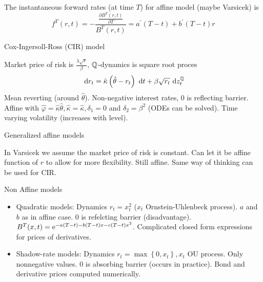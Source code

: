 The instantaneous forward rates (at time $T$) for affine model (maybe Varsicek) is
\[
f^{T}(r, t)=-\frac{\frac{\partial B^{T}(r, t)}{\partial T}}{B^{T}(r,
t)}=a^{\prime}(T-t)+b^{\prime}(T-t) r
\]
\begin{description}
\item[Cox-Ingersoll-Ross (CIR) model] 
\end{description}
Market price of risk is $\frac{\lambda \sqrt{r}}{\beta}$, $\mathbb{Q}$-dynamics is square root proces
\[
\text{ d}  r_{t}=\hat{\kappa}\left(\hat{\theta}-r_{t}\right) \text{ d}  t+\beta \sqrt{r_{t}} \text{ d}  z_{t}^{\mathbb{Q}}
\]
Mean reverting (around $\hat{\theta}$). Non-negative interest rates, 0 is reflecting barrier. Affine
with $\hat{\varphi}=\hat{\kappa} \hat{\theta}, \hat{\kappa}=\hat{\kappa}, \delta_{1}=0$ and
$\delta_{2}=\beta^{2}$ (ODEs can be solved). Time varying volatility (increases with level).


\begin{description}
\item[Generalized affine models] 
\end{description}
In Varsicek we assume the market price of risk is constant. Can let it be affine function of $r$ to
allow for more flexibility. Still affine. Same way of thinking can be used for CIR.

\begin{description}
\item[Non Affine models] 
\end{description}

\begin{itemize}
  \item Quadratic models: Dynamics $r_{t}=x_{t}^{2}$ ($x_{t}$ Ornstein-Uhlenbeck process). $a$ and $b$ as in affine case. 0 is refelcting barrier (disadvantage). $B^{T}(x, t)= \mathrm{e}^{-a(T-t)-b(T-t) x-c(T-t) x^{2}}$. Complicated closed form expressions for prices of derivatives.
  \item Shadow-rate models: Dynamics $r_{t}=\max \left\{0, x_{t}\right\}, x_{t}$ OU process. Only nonnegative values. 0 is absorbing barrier (occurs in practice). Bond and derivative prices computed numerically.
\end{itemize}

